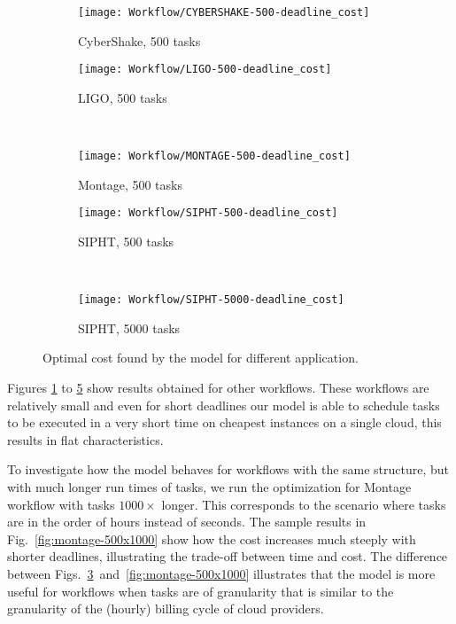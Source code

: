 {    \begin{figure}[tb] 
       \centering       
       \begin{subfigure}[b]{0.49\textwidth}  
         \texttt{[image: Workflow/CYBERSHAKE-500-deadline\_cost]}
         \caption{CyberShake, 500 tasks}
         \label{fig:cybershake-500}
       \end{subfigure}
      \begin{subfigure}[b]{0.49\textwidth}  
        \texttt{[image: Workflow/LIGO-500-deadline\_cost]}
        \caption{LIGO, 500 tasks}
        \label{fig:ligo-500}
      \end{subfigure} \\ 
      \begin{subfigure}[b]{0.49\textwidth}  
        \texttt{[image: Workflow/MONTAGE-500-deadline\_cost]}
        \caption{Montage, 500 tasks}
        \label{fig:montage-500}
      \end{subfigure}             
      \begin{subfigure}[b]{0.49\textwidth}  
        \texttt{[image: Workflow/SIPHT-500-deadline\_cost]}
        \caption{SIPHT, 500 tasks}
        \label{fig:sipht-500}
      \end{subfigure}\\
      \begin{subfigure}[b]{0.49\textwidth}  
        \texttt{[image: Workflow/SIPHT-5000-deadline\_cost]}
        \caption{SIPHT, 5000 tasks}
        \label{fig:sipht-5000}
      \end{subfigure}
      \caption{\label{fig:other}Optimal cost found by the model for different application.}
    \end{figure}  
    
    Figures \ref{fig:cybershake-500} to \ref{fig:sipht-5000}  show results
    obtained for other workflows.
    These workflows are relatively small and even for short deadlines our model
    is able to schedule tasks to be executed in a very short time on cheapest
    instances on a single cloud, this results in flat characteristics.
    
    To investigate how the model behaves for workflows with the same structure,
    but with much longer run times of tasks, we run the optimization for Montage
    workflow with tasks $1000 \times$ longer. This corresponds to the scenario
    where tasks are in the order of hours instead of seconds. The sample results
    in Fig.~\ref{fig:montage-500x1000} show how the cost increases much
    steeply with shorter deadlines, illustrating the trade-off between time and
    cost. The difference between Figs.~\ref{fig:montage-500}~and~\ref{fig:montage-500x1000}
    illustrates that the model is more useful for workflows when tasks are of granularity that is similar to the 
    granularity of the (hourly) billing cycle of cloud providers.
    
}
